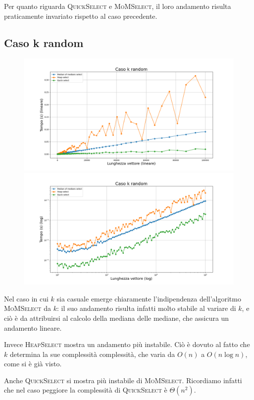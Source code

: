 \documentclass[a4paper]{article}
\newcommand{\QuickSelect}{\textsc{QuickSelect}}
\newcommand{\HeapSelect}{\textsc{HeapSelect}}
\newcommand{\MoMSelect}{\textsc{MoMSelect}}
\begin{document}
Per quanto riguarda \QuickSelect{} e \MoMSelect{}, il loro andamento risulta praticamente invariato rispetto al caso precedente.


\newpage
\subsection{Caso k random}
\begin{figure}[h]
            \centering
            \includegraphics[width=.83\textwidth]{graphs/k_random_n.png}
            \includegraphics[width=.83\textwidth]{graphs/k_random_2xlog.png}
\end{figure}

Nel caso in cui $k$ sia casuale emerge chiaramente l'indipendenza dell'algoritmo \MoMSelect{} da $k$: il suo andamento risulta infatti molto stabile al variare di $k$, e ciò è da attribuirsi al calcolo della mediana delle mediane, che assicura un andamento lineare.

Invece \HeapSelect{} mostra un andamento più instabile.
Ciò è dovuto al fatto che $k$ determina la sue complessità complessità, che varia da $O(n)$ a $O(n\log n)$, come si è già visto.

Anche \QuickSelect{} si mostra più instabile di \MoMSelect{}.
Ricordiamo infatti che nel caso peggiore la complessità di \QuickSelect{} è $\Theta(n^2)$.
\end{document}
